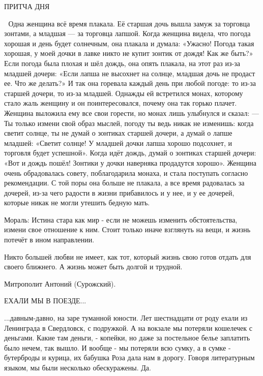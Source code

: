  
 
 
 
 
ПРИТЧА ДНЯ

💛 Одна женщина всё время плакала. Её старшая дочь вышла замуж за торговца зонтами, а младшая — за торговца лапшой.
Когда женщина видела, что погода хорошая и день будет солнечным, она плакала и думала: «Ужасно! Погода такая хорошая, у моей дочки в лавке никто не купит зонтик от дождя! Как же быть?»
Если погода была плохая и шёл дождь, она опять плакала, на этот раз из-за младшей дочери: «Если лапша не высохнет на солнце, младшая дочь не продаст ее. Что же делать?»
И так она горевала каждый день при любой погоде: то из-за старшей дочери, то из-за младшей. Однажды ей встретился монах, которому стало жаль женщину и он поинтересовался, почему она так горько плачет. Женщина выложила ему все свои горести, но монах лишь улыбнулся и сказал:
— Ты только измени свой образ мыслей, погоду ты ведь никак не изменишь: когда светит солнце, ты не думай о зонтиках старшей дочери, а думай о лапше младшей: «Светит солнце! У младшей дочки лапша хорошо подсохнет, и торговля будет успешной». Когда идёт дождь, думай о зонтиках старшей дочери: «Вот и дождь пошёл! Зонтики у дочки наверняка продадутся хорошо».
Женщина очень обрадовалась совету, поблагодарила монаха, и стала поступать согласно рекомендации. С той поры она больше не плакала, а все время радовалась за дочерей, из-за чего радости в жизни прибавилось и у нее, и у ее дочерей, которые никак не могли утешить бедную мать.

Мораль: Истина стара как мир - если не можешь изменить обстоятельства, измени свое отношение к ним. Стоит только иначе взглянуть на вещи, и жизнь потечёт в ином направлении.

Никто большей любви не имеет, как тот, который жизнь свою готов отдать для своего ближнего. 
А жизнь может быть долгой и трудной. 

Митрополит Антоний (Сурожский).


ЕХАЛИ МЫ В ПОЕЗДЕ... 
 
...давным-давно, на заре туманной юности. Лет шестнадцати от роду ехали из Ленинграда в Свердловск, с подружкой. А на вокзале мы потеряли кошелечек с деньгами. Какие там деньги, - копейки, но даже за постельное белье заплатить было нечем, так вышло. И вообще - мы потеряли всю сумку, а в сумке - бутерброды и курица, их бабушка Роза дала нам в дорогу. Говоря литературным языком, мы были несколько обескуражены. Да. 
 
